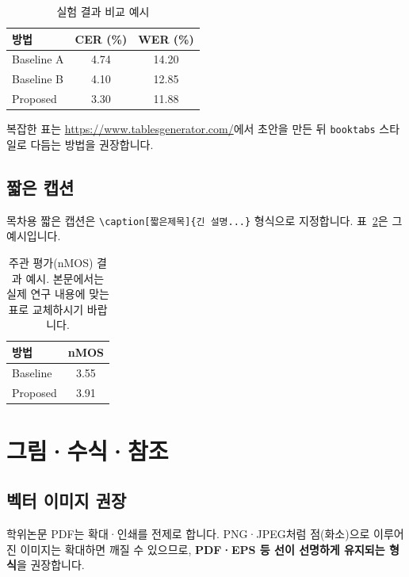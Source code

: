\documentclass[korean]{aisw}
\begin{document}
\begin{table}[htbp]
\centering
\caption{실험 결과 비교 예시}
\label{tab:example}
\begin{tabular}{lcc}
\toprule
\textbf{방법} & \textbf{CER (\%)} & \textbf{WER (\%)} \\
\midrule
Baseline A & 4.74 & 14.20 \\
Baseline B & 4.10 & 12.85 \\
Proposed   & 3.30 & 11.88 \\
\bottomrule
\end{tabular}
\end{table}

복잡한 표는
\url{https://www.tablesgenerator.com/}에서 초안을 만든 뒤
\texttt{booktabs} 스타일로 다듬는 방법을 권장합니다.

\section{짧은 캡션}

목차용 짧은 캡션은
\texttt{\textbackslash caption[짧은제목]\{긴 설명...\}} 형식으로 지정합니다.
표~\ref{tab:nmos}은 그 예시입니다.

\begin{table}[htbp]
\centering
\caption[주관 평가(nMOS) 결과]{주관 평가(nMOS) 결과 예시.
본문에서는 실제 연구 내용에 맞는 표로 교체하시기 바랍니다.}
\label{tab:nmos}
\begin{tabular}{lc}
\toprule
\textbf{방법} & \textbf{nMOS} \\
\midrule
Baseline & 3.55 \\
Proposed & 3.91 \\
\bottomrule
\end{tabular}
\end{table}

\chapter{그림·수식·참조}

\section{벡터 이미지 권장}

학위논문 PDF는 확대·인쇄를 전제로 합니다.
PNG·JPEG처럼 점(화소)으로 이루어진 이미지는 확대하면 깨질 수 있으므로,
\textbf{PDF·EPS 등 선이 선명하게 유지되는 형식}을 권장합니다.
\end{document}
